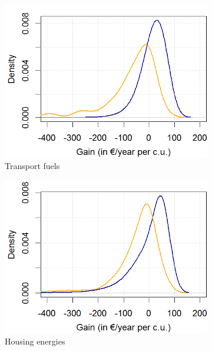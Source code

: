 \documentclass[11pt]{article}
\begin{document}
\begin{figure}[H]
\hspace{-1.5cm}
\begin{subfigure}{.3\textwidth}
\centering
\includegraphics[width=0.28\paperwidth]{Images/pdf_transport_titled.png}
\caption{Transport fuels}
\end{subfigure}\hfill
\begin{subfigure}{.3\textwidth}
\centering
\includegraphics[width=0.28\paperwidth]{Images/pdf_housing_titled.png}
\caption{Housing energies}
\end{subfigure}\hfill
\begin{subfigure}{.3\textwidth}
\centering

\end{subfigure}
\end{figure}
\end{document}
